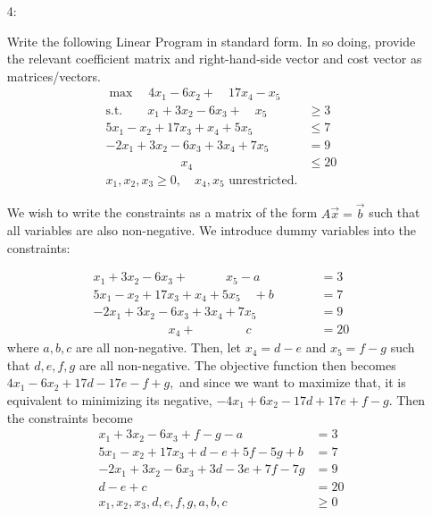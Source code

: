 \documentclass{article}
\begin{document}
\begin{itemize}
	\item[4:] 
		\begin{enumerate}[a)]
			\ii Write the following Linear Program in standard form. In so doing, provide the relevant coefficient matrix and right-hand-side vector and cost vector as matrices/vectors.
			\begin{align*}
				\max\quad 4x_1-6x_2+\quad17x_4-x_5 & \\
				\text{s.t.}\quad\quad x_1+3x_2-6x_3+\quad x_5 &\ge 3 \\
				5x_1-x_2+17x_3+x_4+5x_5 &\le 7 \\
				-2x_1+3x_2-6x_3+3x_4+7x_5 &= 9 \\
				\quad\quad\quad\quad\quad\quad x_4\quad &\le 20 \\
				x_1, x_2, x_3\ge 0, \quad x_4, x_5 \text{ unrestricted.}
			\end{align*}

			\begin{soln}
				We wish to write the constraints as a matrix of the form $A\vec{x}=\vec{b}$ such that all variables are also non-negative. We introduce dummy variables into the constraints:

				\begin{align*}
					x_1+3x_2-6x_3+\quad\quad\quad x_5 - a \quad\quad\quad\quad&= 3 \\
					5x_1-x_2+17x_3+x_4+5x_5\quad+ b \quad\quad&= 7 \\
					-2x_1+3x_2-6x_3+3x_4+7x_5\quad\quad \quad\quad&= 9 \\
					\quad\quad\quad\quad\quad\quad x_4 + \quad\quad\quad\quad  c &= 20
				\end{align*} where $a, b, c$ are all non-negative. Then, let $x_4 = d - e$ and $x_5=f - g$ such that $d, e, f, g$ are all non-negative. The objective function then becomes $4x_1-6x_2+17d-17e-f+g,$ and since we want to maximize that, it is equivalent to minimizing its negative, $-4x_1+6x_2-17d+17e+f-g.$ Then the constraints become 
				\begin{align*}
					x_1+3x_2-6x_3+f - g - a &= 3 \\
					5x_1-x_2+17x_3+d-e+5f-5g+b &= 7 \\
					-2x_1+3x_2-6x_3+3d-3e+7f-7g &= 9 \\
					d - e + c &= 20 \\
					x_1, x_2, x_3, d, e, f, g, a, b, c &\ge 0
				\end{align*} 


\end{soln}
\end{enumerate}
\end{itemize}
\end{document}
